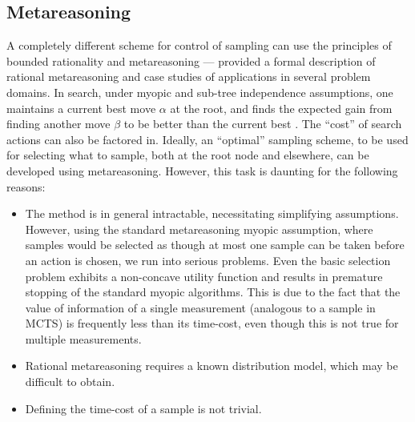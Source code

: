 \documentclass[letterpaper]{article}
\begin{document}

\subsection{Metareasoning}

A completely different scheme for control of sampling can use the
principles of bounded rationality \cite{Horvitz.reasoningabout}
and metareasoning ---  \cite{Russell.right} provided a formal
description of rational metareasoning and case studies of applications
in several problem domains. In search, under myopic and sub-tree independence assumptions,
one maintains a current best move  $\alpha $ at the root, 
and finds the expected gain from finding another move 
$\beta $ to be better than the current best \cite{Russell.right}. The ``cost'' of search
actions can also be factored in.
Ideally, an ``optimal'' sampling scheme, to be used
for selecting what to sample, both at the root node \cite{HayRussell.MCTS} and elsewhere,
can be developed using metareasoning.
However, this task is daunting for the following reasons:
\begin{itemize}
\item The method is in general intractable, necessitating simplifying assumptions.
 However, using the standard metareasoning myopic assumption,
    where samples would be selected as though at most one sample
   can be taken before an action is chosen, we run into serious problems. Even the basic
  selection problem \cite{TolpinShimony.blinkered} exhibits a
  non-concave utility function and results in premature stopping of the
  standard myopic algorithms. This is due to the fact that the value of information of
  a single measurement (analogous to a sample in MCTS) is frequently
  less than its time-cost, even though this is not true for multiple
  measurements. 
\item Rational metareasoning requires a known distribution model, which may be
  difficult to obtain.
\item Defining the time-cost of a sample is not trivial.
\end{itemize}
\end{document}

